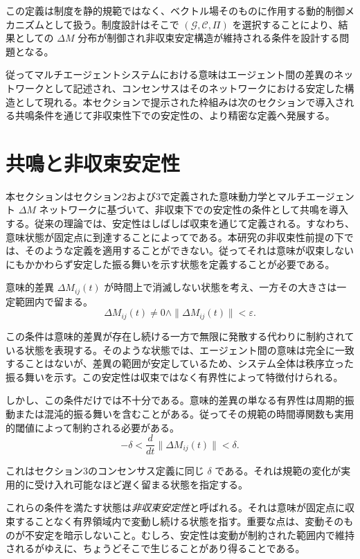 \documentclass[11pt,a4paper]{article}
\theoremstyle{definition}
\begin{document}
この定義は制度を静的規範ではなく、ベクトル場そのものに作用する動的制御メカニズムとして扱う。制度設計はそこで $(\mathcal{G}, \mathcal{C}, \Pi)$ を選択することにより、結果としての $\Delta M$ 分布が制御され非収束安定構造が維持される条件を設計する問題となる。

従ってマルチエージェントシステムにおける意味はエージェント間の差異のネットワークとして記述され、コンセンサスはそのネットワークにおける安定した構造として現れる。本セクションで提示された枠組みは次のセクションで導入される共鳴条件を通じて非収束性下での安定性の、より精密な定義へ発展する。

\section{共鳴と非収束安定性}

本セクションはセクション2および3で定義された意味動力学とマルチエージェント $\Delta M$ ネットワークに基づいて、非収束下での安定性の条件として共鳴を導入する。従来の理論では、安定性はしばしば収束を通じて定義される。すなわち、意味状態が固定点に到達することによってである。本研究の非収束性前提の下では、そのような定義を適用することができない。従ってそれは意味が収束しないにもかかわらず安定した振る舞いを示す状態を定義することが必要である。

意味的差異 $\Delta M_{ij}(t)$ が時間上で消滅しない状態を考え、一方その大きさは一定範囲内で留まる。
\[
\Delta M_{ij}(t) \neq 0 \land \|\Delta M_{ij}(t)\| < \varepsilon.
\]

この条件は意味的差異が存在し続ける一方で無限に発散する代わりに制約されている状態を表現する。そのような状態では、エージェント間の意味は完全に一致することはないが、差異の範囲が安定しているため、システム全体は秩序立った振る舞いを示す。この安定性は収束ではなく有界性によって特徴付けられる。

しかし、この条件だけでは不十分である。意味的差異の単なる有界性は周期的振動または混沌的振る舞いを含むことがある。従ってその規範の時間導関数も実用的閾値によって制約される必要がある。
\[
-\delta < \frac{d}{dt}\|\Delta M_{ij}(t)\| < \delta.
\]

これはセクション3のコンセンサス定義に同じ $\delta$ である。それは規範の変化が実用的に受け入れ可能なほど遅く留まる状態を指定する。

これらの条件を満たす状態は\textit{非収束安定性}と呼ばれる。それは意味が固定点に収束することなく有界領域内で変動し続ける状態を指す。重要な点は、変動そのものが不安定を暗示しないこと。むしろ、安定性は変動が制約された範囲内で維持されるがゆえに、ちょうどそこで生じることがあり得ることである。
\end{document}
